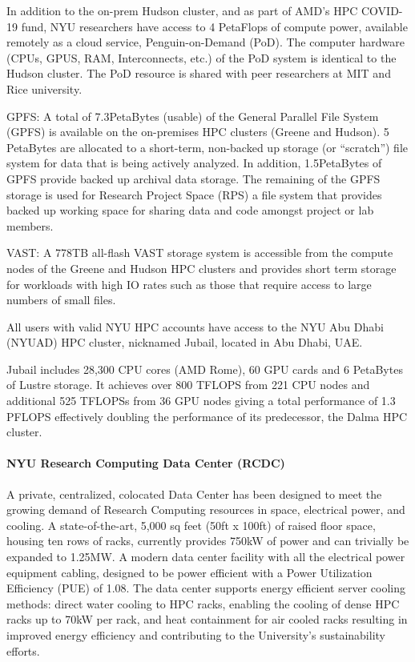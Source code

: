 In addition to the on-prem Hudson cluster, and as part of AMD’s HPC COVID-19 fund, NYU researchers have access to 4 PetaFlops of compute power, available remotely as a cloud service, Penguin-on-Demand (PoD). The computer hardware (CPUs, GPUS, RAM, Interconnects, etc.) of the PoD system is identical to the Hudson cluster. The PoD resource is shared with peer researchers at MIT and Rice university.

GPFS: A total of 7.3PetaBytes (usable) of the General Parallel File System (GPFS) is available on the on-premises HPC clusters (Greene and Hudson). 5 PetaBytes are allocated to a short-term, non-backed up storage (or “scratch”) file system for data that is being actively analyzed. In addition, 1.5PetaBytes of GPFS provide backed up archival data storage. The remaining of the GPFS storage is used for Research Project Space (RPS) a file system that  provides backed up working space for sharing data and code amongst project or lab members.

VAST: A 778TB all-flash VAST storage system is accessible from the compute nodes of the Greene and Hudson HPC clusters and provides short term storage for workloads with high IO rates such as those that require access to large numbers of small files.

All users with valid NYU HPC accounts have access to the NYU Abu Dhabi (NYUAD) HPC cluster, nicknamed Jubail, located in Abu Dhabi, UAE.

Jubail includes 28,300 CPU cores (AMD Rome), 60 GPU cards and 6 PetaBytes of Lustre storage. It achieves over 800 TFLOPS from 221 CPU nodes and additional 525 TFLOPSs from 36 GPU nodes giving a total performance of 1.3 PFLOPS effectively doubling the performance of its predecessor, the Dalma HPC cluster.

\paragraph{NYU Research Computing Data Center (RCDC)}
A private, centralized, colocated Data Center has been designed to meet the growing demand of  Research Computing resources in space, electrical power, and cooling. A state-of-the-art, 5,000 sq feet (50ft x 100ft) of raised floor space, housing ten rows of racks, currently provides 750kW of power and can trivially be expanded to 1.25MW. A modern data center facility with all the electrical power equipment cabling, designed to be power efficient with a Power Utilization Efficiency (PUE) of 1.08. The data center supports energy efficient server cooling methods: direct water cooling to HPC racks, enabling the cooling of dense HPC racks up to 70kW per rack, and heat containment for air cooled racks resulting in improved energy efficiency and contributing to the University's sustainability efforts.

